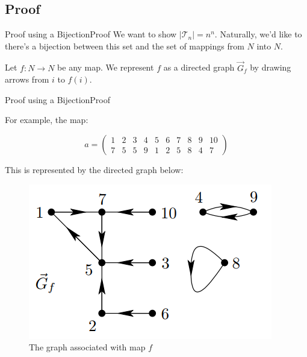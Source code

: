 \documentclass[10pt]{beamer}
\theoremstyle{definition}
\newcommand{\Sthree}{Proof using a Bijection}
\newcommand{\SthreeSSproof}{Proof}
\begin{document}
\subsection{\SthreeSSproof}
\begin{frame}{\Sthree}{\SthreeSSproof}
We want to show $|\mathcal{T}_{n}|=n^{n}$. Naturally, we'd like to there's a bijection between this set and the set of mappings from $N$ into $N$.

Let $f:N \rightarrow N$ be any map. We represent $f$ as a directed graph $\vec G_{f}$ by drawing arrows from $i$ to $f(i)$.

\end{frame}

\begin{frame}{\Sthree}{\SthreeSSproof}

For example, the map:

\[
  a = \left(\begin{matrix}
    1 & 2 & 3 & 4 & 5 & 6 & 7 & 8 & 9 & 10 \\
    7 & 5 & 5 & 9 & 1 & 2 & 5 & 8 & 4 & 7
  \end{matrix}\right)
\]

\pause{}

This is represented by the directed graph below:

\begin{figure}
  \includegraphics[width=0.6\linewidth]{images/section3_graph.png}
  \caption{The graph associated with map $f$}
  \label{fig:section3_graph}
\end{figure}

\end{frame}
\end{document}
